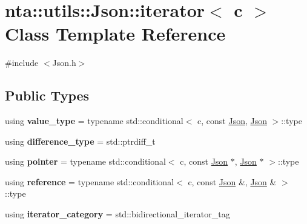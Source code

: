 \hypertarget{classnta_1_1utils_1_1Json_1_1iterator}{}\section{nta\+:\+:utils\+:\+:Json\+:\+:iterator$<$ c $>$ Class Template Reference}
\label{classnta_1_1utils_1_1Json_1_1iterator}


{\ttfamily \#include $<$Json.\+h$>$}

\subsection*{Public Types}
\begin{DoxyCompactItemize}
\item 
\mbox{\label{classnta_1_1utils_1_1Json_1_1iterator_a4f7a3947bf631f014b6af1fba6e55650}} 
using {\bfseries value\+\_\+type} = typename std\+::conditional$<$ c, const \hyperlink{classnta_1_1utils_1_1Json}{Json}, \hyperlink{classnta_1_1utils_1_1Json}{Json} $>$\+::type
\item 
\mbox{\label{classnta_1_1utils_1_1Json_1_1iterator_a1de62fed92f8ed1612fa584b191dce13}} 
using {\bfseries difference\+\_\+type} = std\+::ptrdiff\+\_\+t
\item 
\mbox{\label{classnta_1_1utils_1_1Json_1_1iterator_a9724b64941d2b7097a56ae3bd26f6d6c}} 
using {\bfseries pointer} = typename std\+::conditional$<$ c, const \hyperlink{classnta_1_1utils_1_1Json}{Json} $\ast$, \hyperlink{classnta_1_1utils_1_1Json}{Json} $\ast$ $>$\+::type
\item 
\mbox{\label{classnta_1_1utils_1_1Json_1_1iterator_a0b2b7e34047092ab09ea3e6217cd52a9}} 
using {\bfseries reference} = typename std\+::conditional$<$ c, const \hyperlink{classnta_1_1utils_1_1Json}{Json} \&, \hyperlink{classnta_1_1utils_1_1Json}{Json} \& $>$\+::type
\item 
\mbox{\label{classnta_1_1utils_1_1Json_1_1iterator_a09be53898b73b32af274b07393dc9ce8}} 
using {\bfseries iterator\+\_\+category} = std\+::bidirectional\+\_\+iterator\+\_\+tag
\end{DoxyCompactItemize}
